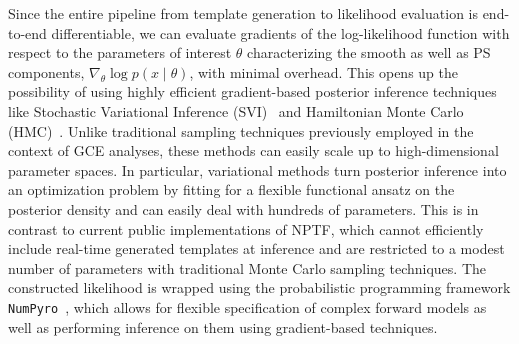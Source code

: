 \documentclass[prd,aps,10pt,nofootinbib,twocolumn,superscriptaddress,preprintnumbers,balancelastpage,longbibliography,floatfix]{revtex4-2}
\begin{document}
Since the entire pipeline from template generation to likelihood evaluation is end-to-end differentiable, we can evaluate gradients of the log-likelihood function with respect to the parameters of interest $\theta$ characterizing the smooth as well as PS components, $\nabla_\theta\log p(x\mid\theta)$, with minimal overhead. This opens up the possibility of using highly efficient gradient-based posterior inference techniques like Stochastic Variational Inference (SVI)~\cite{2012arXiv1206.7051H} and Hamiltonian Monte Carlo (HMC)~\cite{2011arXiv1111.4246H}. 
Unlike traditional sampling techniques previously employed in the context of \Fermi GCE analyses, these methods can easily scale up to high-dimensional parameter spaces. In particular, variational methods turn posterior inference into an optimization problem by fitting for a flexible functional ansatz on the posterior density and can easily deal with hundreds of parameters. This is in contrast to current public implementations of NPTF, which cannot efficiently include real-time generated templates at inference and are restricted to a modest number of parameters with traditional Monte Carlo sampling techniques. 
The constructed likelihood is wrapped using the probabilistic programming framework \texttt{NumPyro}~\cite{2019arXiv191211554P}, which allows for flexible specification of complex forward models as well as performing inference on them using gradient-based techniques.


\end{document}

